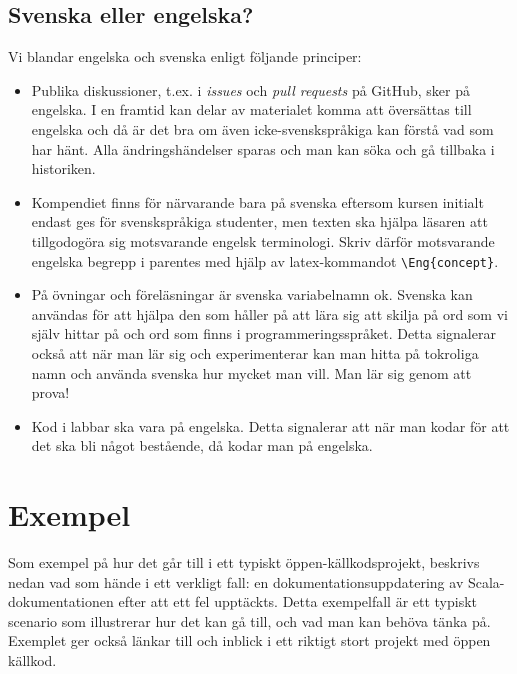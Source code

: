 \subsection{Svenska eller engelska?}

Vi blandar engelska och svenska enligt följande principer:

\begin{itemize}

\item Publika diskussioner, t.ex. i \emph{issues} och \emph{pull requests} på GitHub, sker på engelska. I en framtid kan delar av materialet komma att översättas till engelska och då är det bra om även icke-svenskspråkiga kan förstå vad som har hänt. Alla ändringshändelser sparas och man kan söka och gå tillbaka i historiken.

\item Kompendiet finns för närvarande bara på svenska eftersom kursen initialt endast ges för svenskspråkiga studenter, men texten ska hjälpa läsaren att tillgodogöra sig motsvarande engelsk terminologi. Skriv därför motsvarande engelska begrepp  i parentes med hjälp av latex-kommandot \verb+\Eng{concept}+.

\item På övningar och föreläsningar är svenska variabelnamn ok. Svenska kan användas för att hjälpa den som håller på att lära sig att skilja på ord som vi själv hittar på och ord som finns i programmeringsspråket. Detta signalerar också att när man lär sig och experimenterar kan man hitta på tokroliga namn och använda svenska hur mycket man vill. Man lär sig genom att prova!

\item Kod i labbar ska vara på engelska. Detta signalerar att när man kodar för att det ska bli något bestående, då kodar man på engelska.

\end{itemize}

\section{Exempel}\label{section:OSS-contribution-example}

Som exempel på hur det går till i ett typiskt öppen-källkodsprojekt, beskrivs nedan vad som hände i ett verkligt fall: en dokumentationsuppdatering av Scala-dokumentationen efter att ett fel upptäckts. Detta exempelfall är ett typiskt scenario som illustrerar hur det kan gå till, och vad man kan behöva tänka på. Exemplet ger också länkar till och inblick i ett riktigt stort projekt med öppen källkod.

